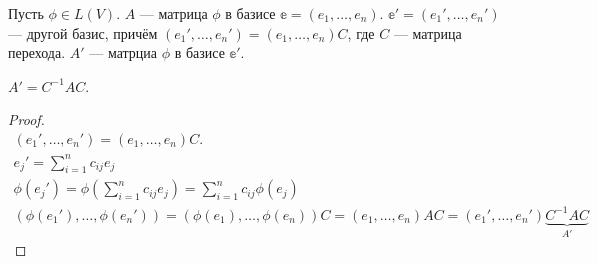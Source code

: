 Пусть $\phi \in L(V)$. $A$ --- матрица $\phi$ в базисе $\mathbb{e} = (e_1, \ldots, e_n)$. $\mathbb{e}' = (e_1', \ldots, e_n')$ --- другой базис, причём $(e_1', \ldots, e_n') = (e_1, \ldots, e_n)C$, где $C$ --- матрица перехода. $A'$ --- матрциа $\phi$ в базисе $\mathbb{e}'$.
\begin{Suggestion}
    $A' = C^{-1}AC$.
\end{Suggestion}
\begin{proof}
    \begin{gather}
        (e_1', \ldots, e_n') = (e_1, \ldots, e_n)C.  \\
        e_j' = \sum\limits_{i=1}^{n} c_{ij}e_j \\
        \phi(e_j') = \phi\left(\sum\limits_{i=1}^{n} c_{ij}e_j\right) = \sum\limits_{i=1}^nc_{ij}\phi(e_j)\\
        (\phi(e_1'), \ldots, \phi(e_n')) = (\phi(e_1),\ldots,\phi(e_n))C = (e_1, \ldots, e_n)AC= (e_1', \ldots, e_n')\underbrace{C^{-1}AC}_{A'}
    \end{gather}
\end{proof}

